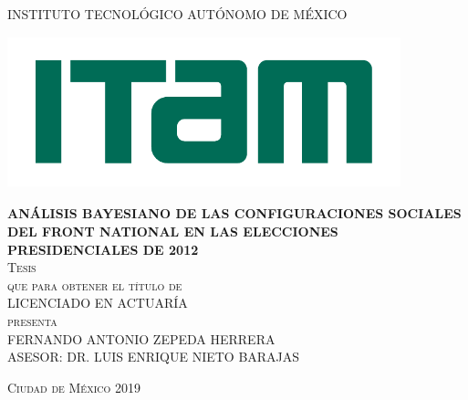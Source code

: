 \begin{titlepage}

\begin{center}

\textsc{\large{INSTITUTO TECNOLÓGICO AUTÓNOMO DE MÉXICO}}\\[2.2em]

\begin{center}
	\includegraphics[width=11.4cm, height = 4.4cm]{Figs/logo-ITAM.pdf}
\end{center}

\textsc{\large \textbf{ANÁLISIS BAYESIANO DE LAS CONFIGURACIONES SOCIALES DEL FRONT NATIONAL EN LAS ELECCIONES PRESIDENCIALES DE 2012}}\\[2.2em]

\textsc{\large Tesis}\\[2em]

\textsc{que para obtener el título de}\\[1em]

\textsc{LICENCIADO EN ACTUARÍA}\\[1em]

\textsc{presenta}\\[2.2em]

\textsc{\Large FERNANDO ANTONIO ZEPEDA HERRERA}\\[2.2em]

\textsc{\large ASESOR: DR. LUIS ENRIQUE NIETO BARAJAS}

\end{center}

\vspace*{\fill}
\textsc{Ciudad de México \hspace*{\fill} 2019}

\end{titlepage}